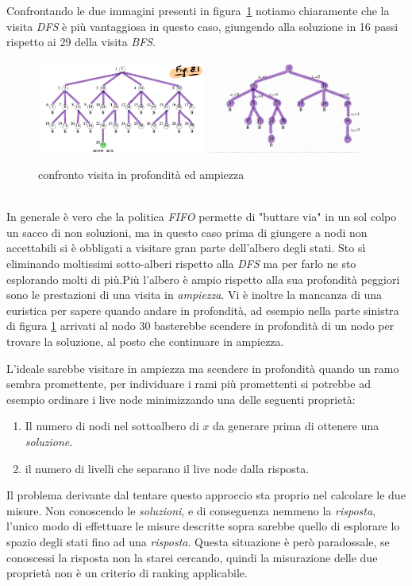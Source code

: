 \documentclass[a4paper]{article}
\begin{document}
\begin{adjustwidth}{.8cm}{0cm}
	Confrontando le due immagini presenti in figura~\ref{FIG:C_2_DFSvsBFS} notiamo chiaramente che la visita \textit{DFS} è più vantaggiosa in questo caso, giungendo alla soluzione in 16 passi rispetto ai 29 della visita \textit{BFS}.\\
\begin{figure}[!ht]
\centering
\includegraphics[width=0.49\textwidth]{./img/C_2_BFS.png}
\includegraphics[width=0.49\textwidth]{./img/C_2_DFS.png}
\caption{confronto visita in profondità ed ampiezza} \label{FIG:C_2_DFSvsBFS}
\end{figure}\\ 
In generale è vero che la politica \textit{FIFO} permette di "buttare via" in un sol colpo un sacco di non soluzioni, ma in questo caso prima di giungere a nodi non accettabili si è obbligati a visitare gran parte dell'albero degli stati.
Sto sì eliminando moltissimi sotto-alberi rispetto alla \textit{DFS} ma per farlo ne sto esplorando molti di più.Più l'albero è ampio rispetto alla sua profondità peggiori sono le prestazioni di una visita in \textit{ampiezza}.
Vi è inoltre la mancanza di una euristica per sapere quando andare in profondità, ad esempio nella parte sinistra di figura \ref{FIG:C_2_DFSvsBFS} arrivati al nodo 30 basterebbe scendere in profondità di un nodo per trovare la soluzione, al posto che continuare in ampiezza.


L'ideale sarebbe visitare in ampiezza ma scendere in profondità quando un ramo sembra promettente, per individuare i rami più promettenti si potrebbe ad esempio ordinare i live node minimizzando una delle seguenti proprietà:
\begin{enumerate}
	\item Il numero di nodi nel sottoalbero di $x$ da generare prima di ottenere una \emph{soluzione}.
	\item il numero di livelli che separano il live node dalla risposta.
\end{enumerate}
Il problema derivante dal tentare questo approccio sta proprio nel calcolare le due misure.
Non conoscendo le \textit{soluzioni}, e di conseguenza nemmeno la \textit{risposta}, l'unico modo di effettuare le misure descritte sopra sarebbe quello di esplorare lo spazio degli stati fino ad una \textit{risposta}.
Questa situazione è però paradossale, se conoscessi la risposta non la starei cercando, quindi la misurazione delle due proprietà non è un criterio di ranking applicabile.
\end{adjustwidth}
\end{document}
